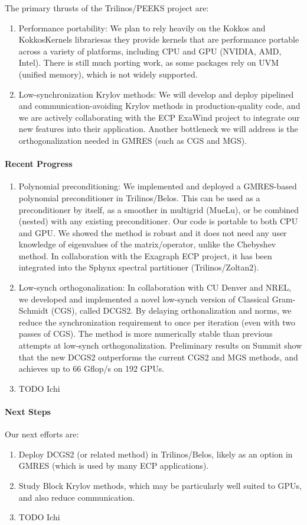 The primary thrusts of the Trilinos/PEEKS project are:
\begin{enumerate}
  \item Performance portability:
        We plan to rely heavily on the Kokkos and KokkosKernels librariesas they provide kernels that are performance portable across a variety of platforms, including CPU and GPU (NVIDIA, AMD, Intel). There is still much porting work, as some packages rely on UVM (unified memory), which is not widely supported.
  \item Low-synchronization Krylov methods:
    	We will develop and deploy pipelined and 
	communication-avoiding Krylov methods in production-quality code, and 
	we are actively collaborating with the ECP ExaWind project to integrate 
        our new features into their application. Another bottleneck we will address is the orthogonalization needed in GMRES (such as CGS and MGS).
\end{enumerate}

\paragraph{Recent Progress}
\begin{enumerate}
\item Polynomial preconditioning: We implemented and deployed a GMRES-based polynomial preconditioner in Trilinos/Belos. This can be used as a preconditioner by itself, as a smoother in multigrid (MueLu), or be combined (nested) with any existing preconditioner. Our code is portable to both CPU and GPU. We showed the method is robust and it does not need any user knowledge of eigenvalues of the matrix/operator, unlike the Chebyshev method. In collaboration with the Exagraph ECP project, it has been integrated into the Sphynx spectral partitioner (Trilinos/Zoltan2).
\item Low-synch orthogonalization: In collaboration with CU Denver and NREL, we developed and implemented a novel low-synch version of Classical Gram-Schmidt (CGS), called DCGS2. By delaying orthonalization and norms, we reduce the synchronization requirement to once per iteration (even with two passes of CGS). The method is more numerically stable than previous attempts at low-synch orthogonalization. Preliminary results on Summit show that the new DCGS2 outperforms the current CGS2 and MGS methods, and achieves up to 66 Gflop/s on 192 GPUs.
\item  TODO Ichi
\end{enumerate}

\paragraph{Next Steps}
Our next efforts are:
\begin{enumerate}
\item Deploy DCGS2 (or related method) in Trilinos/Belos, likely as an option in GMRES (which is used by many ECP applications).
\item Study Block Krylov methods, which may be particularly well suited to GPUs, and also reduce communication.
\item TODO Ichi
\end{enumerate}

